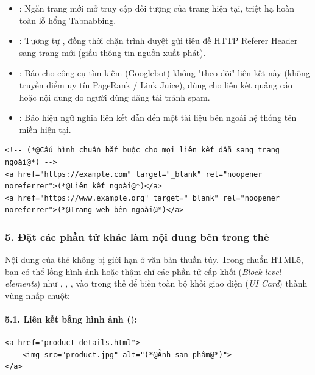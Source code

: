 \begin{itemize}[leftmargin=1.5em, itemsep=3pt, parsep=0pt]
    \item {}: Ngăn trang mới mở truy cập đối tượng  của trang hiện tại, triệt hạ hoàn toàn lỗ hổng Tabnabbing.
    \item {}: Tương tự , đồng thời chặn trình duyệt gửi tiêu đề HTTP Referer Header sang trang mới (giấu thông tin nguồn xuất phát).
    \item {}: Báo cho công cụ tìm kiếm (Googlebot) không "theo dõi" liên kết này (không truyền điểm uy tín PageRank / Link Juice), dùng cho liên kết quảng cáo hoặc nội dung do người dùng đăng tải tránh spam.
    \item {}: Báo hiệu ngữ nghĩa liên kết dẫn đến một tài liệu bên ngoài hệ thống tên miền hiện tại.
\end{itemize}

\begin{codeWindow}
\begin{lstlisting}[language=HTML5]
<!-- (*@Cấu hình chuẩn bắt buộc cho mọi liên kết dẫn sang trang ngoài@*) -->
<a href="https://example.com" target="_blank" rel="noopener noreferrer">(*@Liên kết ngoài@*)</a>
<a href="https://www.example.org" target="_blank" rel="noopener noreferrer">(*@Trang web bên ngoài@*)</a>
\end{lstlisting}
\end{codeWindow}

\subsubsection{5. Đặt các phần tử khác làm nội dung bên trong thẻ }

Nội dung của thẻ  không bị giới hạn ở văn bản thuần túy. Trong chuẩn HTML5, bạn có thể lồng hình ảnh hoặc thậm chí các phần tử cấp khối (\textit{Block-level elements}) như , , ,  vào trong thẻ  để biến toàn bộ khối giao diện (\textit{UI Card}) thành vùng nhấp chuột:

\paragraph{5.1. Liên kết bằng hình ảnh ():}
\begin{codeWindow}
\begin{lstlisting}[language=HTML5]
<a href="product-details.html">
    <img src="product.jpg" alt="(*@Ảnh sản phẩm@*)">
</a>
\end{lstlisting}
\end{codeWindow}

